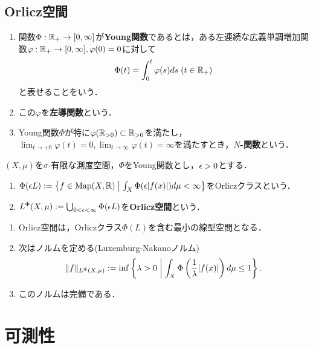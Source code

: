 \documentclass[uplatex,dvipdfmx]{jsreport}
\begin{document}
\subsection{Orlicz空間}

\begin{definition}\mbox{}
    \begin{enumerate}
        \item 関数$\Phi:\mathbb{R}_+\to[0,\infty]$が\textbf{Young関数}であるとは，ある左連続な広義単調増加関数$\varphi:\mathbb{R}_+\to[0,\infty],\varphi(0)=0$に対して
        \[\Phi(t)=\int^t_0\varphi(s)ds\;(t\in\mathbb{R}_+)\]
        と表せることをいう．
        \item この$\varphi$を\textbf{左導関数}という．
        \item Young関数$\Phi$が特に$\varphi(\mathbb{R}_{>0})\subset\mathbb{R}_{>0}$を満たし，$\lim_{t\to+0}\varphi(t)=0,\lim_{t\to\infty}\varphi(t)=\infty$を満たすとき，\textbf{$N$-関数}という．
    \end{enumerate}
\end{definition}

\begin{definition}
    $(X,\mu)$を$\sigma$-有限な測度空間，$\Phi$をYoung関数とし，$\epsilon>0$とする．
    \begin{enumerate}
        \item $\Phi(\epsilon L):=\left\{f\in\mathrm{Map}(X,\mathbb{R})\;\middle|\;\int_X\Phi(\epsilon\lvert f(x)\rvert)d\mu<\infty\right\}$をOrliczクラスという．
        \item $L^\Phi(X,\mu):=\bigcup_{0<\epsilon<\infty}\Phi(\epsilon L)$を\textbf{Orlicz空間}という．
    \end{enumerate}
\end{definition}

\begin{lemma}[Orlicz空間はBanach空間になる]\mbox{}
    \begin{enumerate}
        \item Orlicz空間は，Orliczクラス$\Phi(L)$を含む最小の線型空間となる．
        \item 次はノルムを定める(Luxemburg-Nakanoノルム)
        \[\|f\|_{L^\Phi(X,\mu)}:=\inf\left\{\lambda>0\;\middle|\;\int_X\Phi\left(\frac{1}{\lambda}\lvert f(x)\rvert\right)d\mu\le 1\right\}.\]
        \item このノルムは完備である．
    \end{enumerate}
\end{lemma}

\section{可測性}
\end{document}
